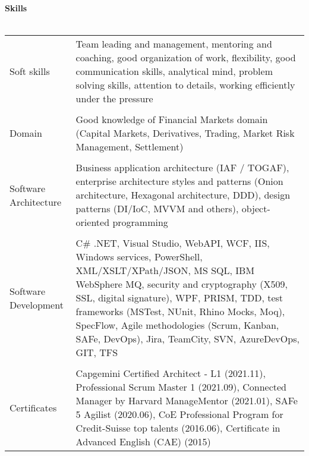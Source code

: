 \textbf{Skills}
\\
\\
\begin{tabular}{p{}|p{}}
Soft skills
& Team leading and management, mentoring and coaching, good organization of work, flexibility, good communication skills, analytical mind, problem solving skills, attention to details, working efficiently under the pressure \\
& \\
Domain
& Good knowledge of Financial Markets domain (Capital Markets, Derivatives, Trading, Market Risk Management, Settlement)\\
& \\
Software Architecture
& Business application architecture (IAF / TOGAF), enterprise architecture styles and patterns (Onion architecture, Hexagonal architecture, DDD), design patterns (DI/IoC, MVVM and others), object-oriented programming \\
& \\
Software Development
& C\# .NET, Visual Studio, WebAPI, WCF, IIS, Windows services, PowerShell, XML/XSLT/XPath/JSON, MS SQL, IBM WebSphere MQ, security and cryptography (X509, SSL, digital signature), WPF, PRISM, TDD, test frameworks (MSTest, NUnit, Rhino Mocks, Moq), SpecFlow, Agile methodologies (Scrum, Kanban, SAFe, DevOps), Jira, TeamCity, SVN, AzureDevOps, GIT, TFS \\
& \\
Certificates
& Capgemini Certified Architect - L1 (2021.11), Professional Scrum Master 1 (2021.09), Connected Manager by Harvard ManageMentor (2021.01), SAFe 5 Agilist (2020.06), CoE Professional Program for Credit-Suisse top talents (2016.06), Certificate in Advanced English (CAE) (2015) \\
\end{tabular}